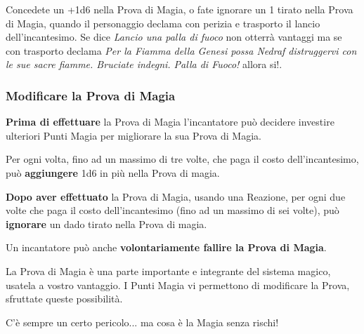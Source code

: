 \begin{multicols}{2}
\begin{changemargin}{0.3cm}{0.3cm}\begin{narratore}
Concedete un +1d6 nella Prova di Magia, o fate ignorare un 1 tirato nella Prova di Magia, quando il personaggio declama con perizia e trasporto il lancio dell'incantesimo. Se dice \emph{Lancio una palla di fuoco} non otterrà vantaggi ma se con trasporto declama \emph{Per la Fiamma della Genesi possa Nedraf distruggervi con le sue sacre fiamme. Bruciate indegni. Palla di Fuoco!} allora si!.
\end{narratore}\end{changemargin}

\subsubsection{Modificare la Prova di Magia}

\textbf{Prima di effettuare} la Prova di Magia l'incantatore può decidere investire ulteriori Punti Magia per migliorare la sua Prova di Magia.

Per ogni volta, fino ad un massimo di tre volte, che paga il costo dell'incantesimo, può \textbf{aggiungere} 1d6 in più nella Prova di magia. 

\textbf{Dopo aver effettuato} la Prova di Magia, usando una Reazione, per ogni due volte che paga il costo dell'incantesimo (fino ad un massimo di sei volte), può \textbf{ignorare} un dado tirato nella Prova di magia. 

Un incantatore può anche \textbf{volontariamente fallire la Prova di Magia}.

\begin{changemargin}{0.3cm}{0.3cm}\begin{tcolorbox}[title = Osare la Prova di Magia]
La Prova di Magia è una parte importante e integrante del sistema magico, usatela a vostro vantaggio. I Punti Magia vi permettono di modificare la Prova, sfruttate queste possibilità.

C'è sempre un certo pericolo... ma cosa è la Magia senza rischi!
\end{tcolorbox}\end{changemargin}




\end{multicols}
